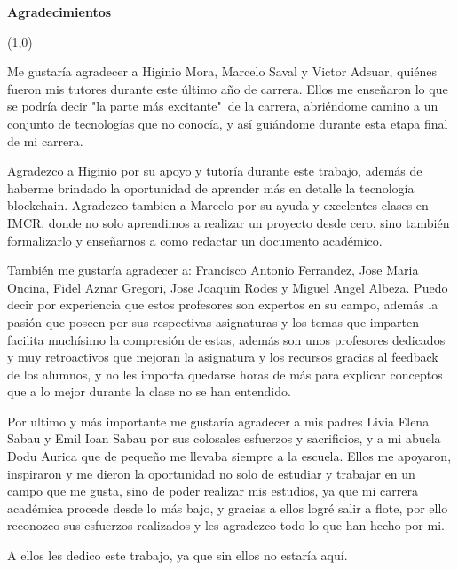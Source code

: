 \thispagestyle{empty}
{\Huge{ \textbf{ Agradecimientos }}}

\begin{center}
\line(1,0){\textwidth}
\end{center}

Me gustaría agradecer a Higinio Mora, Marcelo Saval y Victor Adsuar, quiénes fueron mis tutores durante este último año de carrera. Ellos me enseñaron lo que se podría decir "la parte más excitante"\  de la carrera, abriéndome camino a un conjunto de tecnologías que no conocía, y así guiándome durante esta etapa final de mi carrera. 

\bigskip

Agradezco a Higinio por su apoyo y tutoría durante este trabajo, además de haberme brindado la oportunidad de aprender más en detalle la tecnología blockchain. Agradezco tambien a Marcelo por su ayuda y excelentes clases en IMCR, donde no solo aprendimos a realizar un proyecto desde cero, sino también formalizarlo y enseñarnos a como redactar un documento académico.

\bigskip

También me gustaría agradecer a: Francisco Antonio Ferrandez, Jose Maria Oncina, Fidel Aznar Gregori, Jose Joaquin Rodes y Miguel Angel Albeza. Puedo decir por experiencia que estos profesores son expertos en su campo, además la pasión que poseen por sus respectivas asignaturas y los temas que imparten facilita muchísimo la compresión de estas, además son unos profesores dedicados y muy retroactivos que mejoran la asignatura y los recursos gracias al feedback de los alumnos, y no les importa quedarse horas de más para explicar conceptos que a lo mejor durante la clase no se han entendido.

\bigskip

Por ultimo y más importante me gustaría agradecer a mis padres Livia Elena Sabau y Emil Ioan Sabau por sus colosales esfuerzos y sacrificios, y a mi abuela Dodu Aurica que de pequeño me llevaba siempre a la escuela. Ellos me apoyaron, inspiraron y me dieron la oportunidad no solo de estudiar y trabajar en un campo que me gusta, sino de poder realizar mis estudios, ya que mi carrera académica procede desde lo más bajo, y gracias a ellos logré salir a flote, por ello reconozco sus esfuerzos realizados y les agradezco todo lo que han hecho por mi.

\bigskip

A ellos les dedico este trabajo, ya que sin ellos no estaría aquí.


